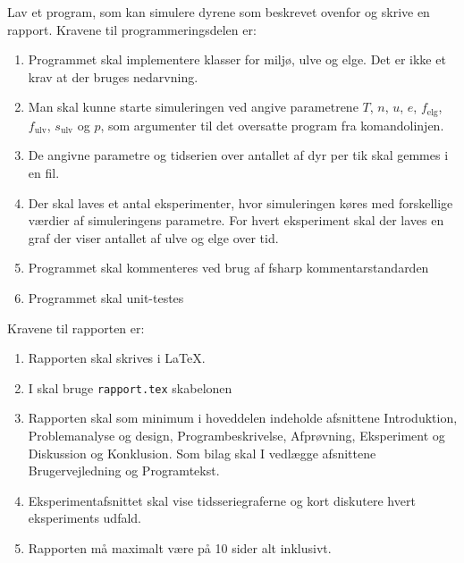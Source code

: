 Lav et program, som kan simulere dyrene som beskrevet ovenfor og skrive en rapport. Kravene til programmeringsdelen er:
\begin{enumerate}
\item Programmet skal implementere klasser for miljø, ulve og elge. Det er ikke et krav at der bruges nedarvning.
\item Man skal kunne starte simuleringen ved angive parametrene $T$, $n$, $u$, $e$, $f_{\text{elg}}$, $f_{\text{ulv}}$, $s_{\text{ulv}}$ og $p$, som argumenter til det oversatte program fra komandolinjen.
\item De angivne parametre og tidserien over antallet af dyr per tik skal gemmes i en fil.
\item Der skal laves et antal eksperimenter, hvor simuleringen køres med forskellige værdier af simuleringens parametre. For hvert eksperiment skal der laves en graf der viser antallet af ulve og elge over tid.
\item Programmet skal kommenteres ved brug af fsharp kommentarstandarden
\item Programmet skal unit-testes
\end{enumerate}
Kravene til rapporten er:
\begin{enumerate}[resume]
\item Rapporten skal skrives i \LaTeX.
\item I skal bruge \texttt{rapport.tex} skabelonen
\item Rapporten skal som minimum i hoveddelen indeholde afsnittene Introduktion, Problemanalyse og design, Programbeskrivelse, Afprøvning, Eksperiment og Diskussion og Konklusion. Som bilag skal I vedlægge afsnittene Brugervejledning og Programtekst.
\item Eksperimentafsnittet skal vise tidsseriegraferne og kort diskutere hvert eksperiments udfald.
\item Rapporten må maximalt være på 10 sider alt inklusivt.
\end{enumerate}

